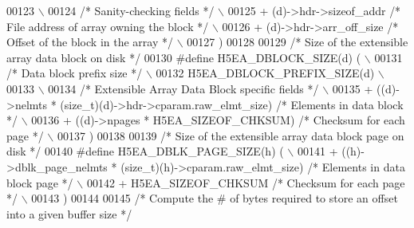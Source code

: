 \begin{DoxyCode}
00123 \textcolor{preprocessor}{                                                                              \(\backslash\)}
00124 \textcolor{preprocessor}{    }\textcolor{comment}{/* Sanity-checking fields */}\textcolor{preprocessor}{                                              \(\backslash\)}
00125 \textcolor{preprocessor}{    + (d)->hdr->sizeof\_addr          }\textcolor{comment}{/* File address of array owning the block */}\textcolor{preprocessor}{ \(\backslash\)}
00126 \textcolor{preprocessor}{    + (d)->hdr->arr\_off\_size         }\textcolor{comment}{/* Offset of the block in the array */}\textcolor{preprocessor}{   \(\backslash\)}
00127 \textcolor{preprocessor}{    )}
00128 
00129 \textcolor{comment}{/* Size of the extensible array data block on disk */}
00130 \textcolor{preprocessor}{#define H5EA\_DBLOCK\_SIZE(d)     (                                             \(\backslash\)}
00131 \textcolor{preprocessor}{    }\textcolor{comment}{/* Data block prefix size  */}\textcolor{preprocessor}{                                             \(\backslash\)}
00132 \textcolor{preprocessor}{    H5EA\_DBLOCK\_PREFIX\_SIZE(d)                                                \(\backslash\)}
00133 \textcolor{preprocessor}{                                                                              \(\backslash\)}
00134 \textcolor{preprocessor}{    }\textcolor{comment}{/* Extensible Array Data Block specific fields */}\textcolor{preprocessor}{                         \(\backslash\)}
00135 \textcolor{preprocessor}{    + ((d)->nelmts * (size\_t)(d)->hdr->cparam.raw\_elmt\_size) }\textcolor{comment}{/* Elements in data block  */}\textcolor{preprocessor}{  \(\backslash\)}
00136 \textcolor{preprocessor}{    + ((d)->npages * H5EA\_SIZEOF\_CHKSUM)        }\textcolor{comment}{/* Checksum for each page */}\textcolor{preprocessor}{  \(\backslash\)}
00137 \textcolor{preprocessor}{    )}
00138 
00139 \textcolor{comment}{/* Size of the extensible array data block page on disk */}
00140 \textcolor{preprocessor}{#define H5EA\_DBLK\_PAGE\_SIZE(h)     (                          \(\backslash\)}
00141 \textcolor{preprocessor}{    + ((h)->dblk\_page\_nelmts * (size\_t)(h)->cparam.raw\_elmt\_size) }\textcolor{comment}{/* Elements in data block page */}\textcolor{preprocessor}{  \(\backslash\)}
00142 \textcolor{preprocessor}{    + H5EA\_SIZEOF\_CHKSUM                        }\textcolor{comment}{/* Checksum for each page */}\textcolor{preprocessor}{  \(\backslash\)}
00143 \textcolor{preprocessor}{    )}
00144 
00145 \textcolor{comment}{/* Compute the # of bytes required to store an offset into a given buffer size */}

\end{DoxyCode}
